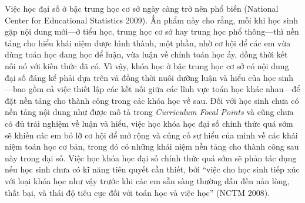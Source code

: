 {{    Việc học đại số ở bậc trung học cơ sở ngày càng trở nên phổ biến (National Center for Educational Statistics 2009). Ấn phẩm này cho rằng, mỗi khi học sinh gặp nội dung mới---ở tiểu học, trung học cơ sở hay trung học phổ thông---thì nền tảng cho hiểu khái niệm được hình thành, một phần, nhờ cơ hội để các em vừa dùng toán học đang học để luận, vừa luận về chính toán học ấy, đồng thời kết nối nó với kiến thức đã có. Vì vậy, khóa học ở bậc trung học cơ sở có nội dung đại số đáng kể phải dựa trên và đồng thời nuôi dưỡng luận và hiểu của học sinh---bao gồm cả việc thiết lập các kết nối giữa các lĩnh vực toán học khác nhau---để đặt nền tảng cho thành công trong các khóa học về sau. Đối với học sinh chưa có nền tảng nội dung như được mô tả trong \emph{Curriculum Focal Points} và cũng chưa có đủ trải nghiệm về luận và hiểu, việc học khóa học đại số chính thức quá sớm sẽ khiến các em bỏ lỡ cơ hội để mở rộng và củng cố sự hiểu của mình về các khái niệm toán học cơ bản, trong đó có những khái niệm nền tảng cho thành công sau này trong đại số. Việc học khóa học đại số chính thức quá sớm sẽ phản tác dụng nếu học sinh chưa có kĩ năng tiên quyết cần thiết, bởi ``việc cho học sinh tiếp xúc với loại khóa học như vậy trước khi các em sẵn sàng thường dẫn đến nản lòng, thất bại, và thái độ tiêu cực đối với toán học và việc học'' (NCTM 2008).}
  }{\NOTE{}}


